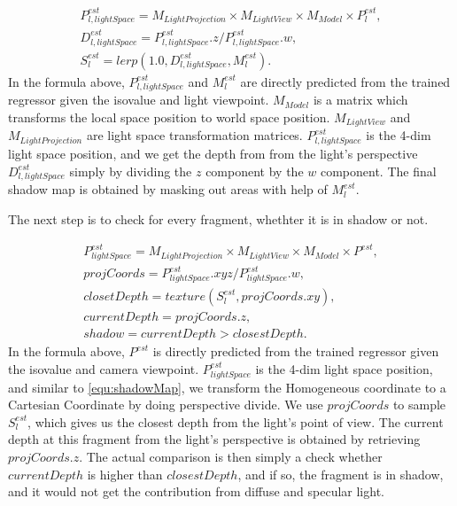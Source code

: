 \documentclass[journal]{vgtc}                %
\begin{document}
\begin{equation}
\begin{aligned}
P_{l, lightSpace}^{est} = M_{LightProjection} \times M_{LightView} \times M_{Model} \times P_l^{est}, \\
D_{l, lightSpace}^{est} = P_{l, lightSpace}^{est}.z / P_{l, lightSpace}^{est}.w, \\
S_{l}^{est} = lerp(1.0, D_{l, lightSpace}^{est}, M_{l}^{est}). 
\label{equ:shadowMap}
\end{aligned}
\end{equation}
In the formula above, $P_{l, lightSpace}^{est}$ and $M_{l}^{est}$ are directly predicted from the trained regressor given the isovalue and light viewpoint. $ M_{Model}$ is a matrix which transforms the local space position to world space position. $M_{LightView}$ and $ M_{LightProjection}$ are light space transformation matrices. $P_{l, lightSpace}^{est}$ is the 4-dim light space position, and we get the depth from from the light's perspective $D_{l, lightSpace}^{est}$ simply by dividing the $z$ component by the $w$ component. The final shadow map is obtained by masking out areas with help of $M_{l}^{est}$.      

The next step is to check for every fragment, whethter it is in shadow or not. 

\begin{equation}
\begin{aligned}
P_{lightSpace}^{est} = M_{LightProjection} \times M_{LightView} \times M_{Model} \times P^{est}, \\
projCoords = P_{lightSpace}^{est}.xyz / P_{lightSpace}^{est}.w, \\ 
closetDepth = texture(S_{l}^{est}, projCoords.xy), \\
currentDepth = projCoords.z, \\
shadow = currentDepth > closestDepth.
\end{aligned}
\end{equation}
In the formula above, $P^{est}$ is directly predicted from the trained regressor given the isovalue and camera viewpoint. $P_{lightSpace}^{est}$ is the 4-dim light space position, and similar to \ref{equ:shadowMap}, we transform the Homogeneous coordinate to a Cartesian Coordinate by doing perspective divide. We use $projCoords$ to sample $S_{l}^{est}$, which gives us the closest depth from the light's point of view. The current depth at this fragment from the light's perspective is obtained by retrieving $projCoords.z$. The actual comparison is then simply a check whether $currentDepth$ is higher than $closestDepth$, and if so, the fragment is in shadow, and it would not get the contribution from diffuse and specular light. 
\end{document}
